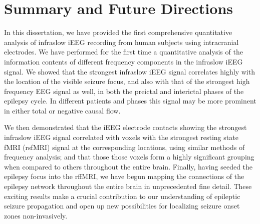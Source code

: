 
\chapter{Summary and Future Directions}
\label{chapter-summary}

In this dissertation, we have provided the first comprehensive quantitative analysis of infraslow iEEG recording from human subjects using intracranial electrodes. We have performed for the first time a quantitative analysis of the information contents of different frequency components in the infraslow iEEG signal. We showed that the strongest infraslow iEEG signal correlates highly with the location of the visible seizure focus, and also with that of the strongest high frequency EEG signal as well, in both the preictal and interictal phases of the epilepsy cycle. In different patients and phases this signal may be more prominent in either total or negative causal flow.

We then demonstrated that the iEEG electrode contacts showing the strongest infraslow iEEG signal correlated with voxels with the strongest resting state fMRI (rsfMRI) signal at the corresponding locations, using similar methods of frequency analysis; and that those those voxels form a highly significant grouping when compared to others throughout the entire brain. Finally, having seeded the epilepsy focus into the rffMRI, we have begun mapping the connections of the epilepsy network throughout the entire brain in unprecedented fine detail.
These exciting results make a crucial contribution to our understanding of epileptic seizure propagation and open up new possibilities for localizing seizure onset zones non-invasively.






